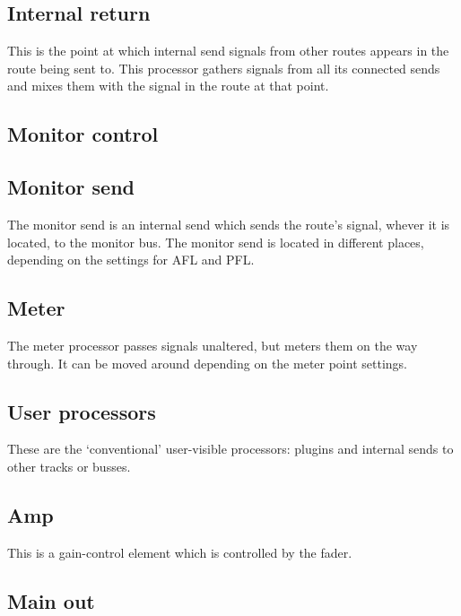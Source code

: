 \documentclass[10pt,a4paper]{book}
\begin{document}

\subsection{Internal return}

This is the point at which internal send signals from other routes
appears in the route being sent to.  This processor gathers signals
from all its connected sends and mixes them with the signal in the
route at that point.

\subsection{Monitor control}


\subsection{Monitor send}

The monitor send is an internal send which sends the route's signal,
whever it is located, to the monitor bus.  The monitor send is located
in different places, depending on the settings for AFL and PFL\@.

\subsection{Meter}

The meter processor passes signals unaltered, but meters them on the
way through.  It can be moved around depending on the meter point settings.

\subsection{User processors}

These are the `conventional' user-visible processors: plugins and
internal sends to other tracks or busses.

\subsection{Amp}

This is a gain-control element which is controlled by the fader.

\subsection{Main out}
\end{document}
